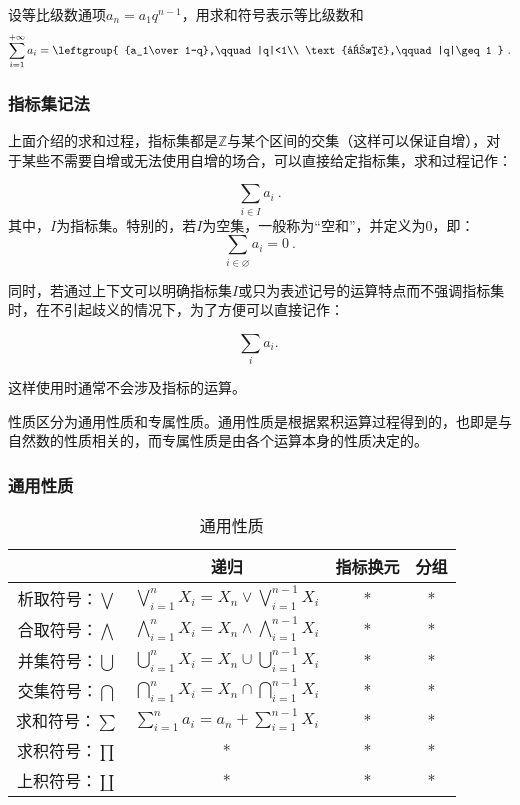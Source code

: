\begin{example}{设等比级数通项$a_n=a_1q^{n-1}$，用求和符号表示等比级数和}
$$
\sum_{i=1}^{+\infty} a_i=
\leftgroup{
{a_1\over 1-q},\qquad |q|<1\\  
\text{发散},\qquad |q|\geq1
} ~.
$$
\end{example}

\subsubsection{指标集记法}

上面介绍的求和过程，指标集都是$\mathbb{Z}$与某个区间的交集（这样可以保证自增），对于某些不需要自增或无法使用自增的场合，可以直接给定指标集，求和过程记作：

\begin{equation}
\sum_{i\in I} a_i~.
\end{equation}
其中，$I$为指标集。特别的，若$I$为空集，一般称为“空和”，并定义为0，即：
\begin{equation}
\sum_{i\in \varnothing} a_i=0~.
\end{equation}

同时，若通过上下文可以明确指标集$I$或只为表述记号的运算特点而不强调指标集时，在不引起歧义的情况下，为了方便可以直接记作：

\begin{equation}
\sum_i a_i.~
\end{equation}

这样使用时通常不会涉及指标的运算。


性质区分为通用性质和专属性质。通用性质是根据累积运算过程得到的，也即是与自然数的性质相关的，而专属性质是由各个运算本身的性质决定的。
\subsubsection{通用性质}




\begin{table}[ht]
\centering
\caption{通用性质}\label{tab_LgOper1}
\begin{tabular}{|c|c|c|c|}
\hline
 & 递归 & 指标换元 & 分组 \\
\hline
析取符号：$\bigvee$ & $\displaystyle\bigvee_{i=1}^n X_i=X_n\vee \bigvee_{i=1}^{n-1}X_i$ & * & * \\
\hline
合取符号：$\bigwedge$ &$\displaystyle\bigwedge_{i=1}^n X_i=X_n\wedge \bigwedge_{i=1}^{n-1}X_i$  & * & * \\
\hline
并集符号：$\bigcup$& $\displaystyle\bigcup_{i=1}^n X_i=X_n\cup \bigcup_{i=1}^{n-1}X_i$  & * & * \\
\hline
交集符号：$\bigcap$ & $\displaystyle\bigcap_{i=1}^n X_i=X_n\cap \bigcap_{i=1}^{n-1}X_i$ & * & * \\
\hline
求和符号：$\sum$ & $\displaystyle\sum_{i=1}^n a_i=a_n+ \sum_{i=1}^{n-1}X_i$ & * & * \\
\hline
求积符号：$\prod$& * & * & * \\
\hline
上积符号：$\coprod$   & * & * & * \\
\hline
\end{tabular}
\end{table}

